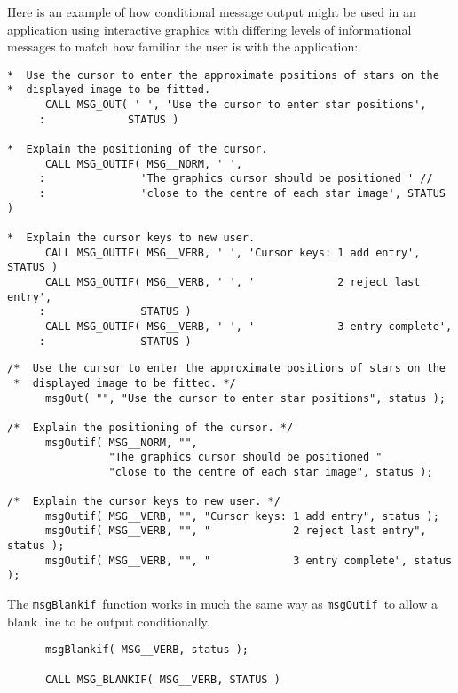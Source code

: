 \documentclass[twoside,11pt]{article}
\renewcommand{\_}{\texttt{\symbol{95}}}
\newcommand{\func}[1]{\texttt{#1}}
\newcommand{\msgblankif}{\func{msgBlankif}}
\newcommand{\msgoutif}{\func{msgOutif}}
\begin{document}
Here is an example of how conditional message output might be used 
in an application using interactive graphics with differing levels of 
informational messages to match how familiar the user is with the application:
\begin {small}
\begin{verbatim}
*  Use the cursor to enter the approximate positions of stars on the 
*  displayed image to be fitted.
      CALL MSG_OUT( ' ', 'Use the cursor to enter star positions', 
     :             STATUS )

*  Explain the positioning of the cursor.
      CALL MSG_OUTIF( MSG__NORM, ' ', 
     :               'The graphics cursor should be positioned ' //
     :               'close to the centre of each star image', STATUS )

*  Explain the cursor keys to new user.
      CALL MSG_OUTIF( MSG__VERB, ' ', 'Cursor keys: 1 add entry', STATUS )
      CALL MSG_OUTIF( MSG__VERB, ' ', '             2 reject last entry', 
     :               STATUS )
      CALL MSG_OUTIF( MSG__VERB, ' ', '             3 entry complete', 
     :               STATUS )
\end{verbatim}
\end {small}
\begin {small}
\begin{verbatim}
/*  Use the cursor to enter the approximate positions of stars on the 
 *  displayed image to be fitted. */
      msgOut( "", "Use the cursor to enter star positions", status );

/*  Explain the positioning of the cursor. */
      msgOutif( MSG__NORM, "",
                "The graphics cursor should be positioned "
                "close to the centre of each star image", status );

/*  Explain the cursor keys to new user. */
      msgOutif( MSG__VERB, "", "Cursor keys: 1 add entry", status );
      msgOutif( MSG__VERB, "", "             2 reject last entry", status );
      msgOutif( MSG__VERB, "", "             3 entry complete", status );
\end{verbatim}
\end {small}

The \msgblankif\ function works in much the same way as \msgoutif\ to
allow a blank line to be output conditionally.

\begin{small}
\begin{verbatim}
      msgBlankif( MSG__VERB, status );

      CALL MSG_BLANKIF( MSG__VERB, STATUS )
\end{verbatim}
\end{small}
\end{document}
